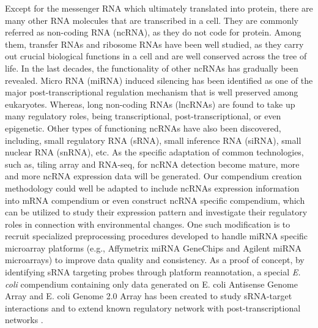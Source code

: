 Except for the messenger RNA which ultimately translated into protein, there are
many other RNA molecules that are transcribed in a cell.
%
They are commonly referred as non-coding RNA (ncRNA), as they do not code for
protein.
%
Among them, transfer RNAs and ribosome RNAs have been well studied, as they
carry out crucial biological functions in a cell and are well conserved across
the tree of life.
%
In the last decades, the functionality of other ncRNAs has gradually been
revealed.
%
Micro RNA (miRNA) induced silencing has been identified as one of the major
post-transcriptional regulation mechanism that is well preserved among
eukaryotes\cite{Chen2007a}.
%
Whereas, long non-coding RNAs (lncRNAs) are found to take up many regulatory
roles, being transcriptional, post-transcriptional, or even
epigenetic\cite{Baker2011}.
%
Other types of functioning ncRNAs have also been discovered, including, small
regulatory RNA (sRNA), small inference RNA (siRNA), small nuclear RNA (snRNA),
etc.
%
As the specific adaptation of common technologies, such as, tiling array and
RNA-seq, for ncRNA detection become mature, more and more ncRNA expression data
will be generated.
%
Our compendium creation methodology could well be adapted to include ncRNAs
expression information into mRNA compendium or even construct ncRNA specific
compendium, which can be utilized to study their expression pattern and
investigate their regulatory roles in connection with environmental changes.
%
One such modification is to recruit specialized preprocessing
procedures developed to handle miRNA specific microarray platforms
(e.g., Affymetrix miRNA GeneChips and Agilent miRNA microarrays) to
improve data quality and consistency.
%
As a proof of concept, by identifying sRNA targeting probes through platform 
reannotation, a special \textit{E. coli} compendium containing only data 
generated on E. coli Antisense Genome Array and E. coli Genome 2.0 Array has 
been created to study sRNA-target interactions and to extend known regulatory 
network with post-transcriptional networks \cite{Ishchukov2014}.





















